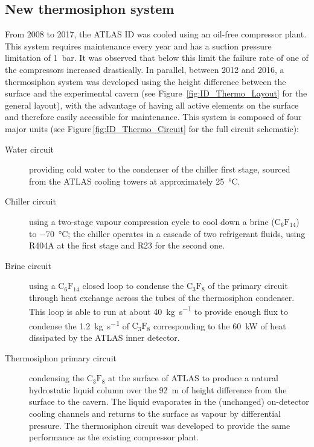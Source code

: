\documentclass[cernpreprint, atlasdraft=false, UKenglish,british,orcidlogo, texmf, orcidlogo]{atlasdoc}
\begin{document}
\subsection{New  thermosiphon system}
 
From 2008 to 2017, the ATLAS \gls{ID} was cooled using an oil-free compressor plant. This system requires maintenance every year and has a suction pressure limitation of \SI{1}{\bar}. It was observed that below this limit the failure rate of one of the compressors increased drastically. In parallel, between 2012 and 2016, a thermosiphon system was developed using the height difference between the surface and the experimental cavern (see Figure~\ref{fig:ID_Thermo_Layout} for the general layout), with the advantage of having all active elements on the surface and therefore easily accessible for maintenance. This system is composed of four major units (see Figure\,\ref{fig:ID_Thermo_Circuit} for the full circuit schematic):
 
\begin{description}
\item[Water circuit] providing cold water to the condenser of
the chiller first stage, sourced from the ATLAS
cooling towers at approximately \SI{25}{\degreeCelsius}.
\item[Chiller circuit] using a two-stage vapour compression cycle
to cool down a brine (${\text{C}}_6{\text{F}}_{14}$) to
\SI{-70}{\degreeCelsius}; the chiller operates in a cascade of two refrigerant fluids, using
R404A at the first stage and R23 for the second one.
\item[Brine circuit] using a ${\text{C}}_6{\text{F}}_{14}$ closed
loop to condense the ${\text{C}}_3{\text{F}}_{8}$ of the primary circuit through heat exchange across the tubes of the thermosiphon condenser. This
loop is able to run at about \SI{40}{\kg\per\second} to provide
enough flux to condense the \SI{1.2}{\kg\per\second} of
${\text{C}}_3{\text{F}}_{8}$ corresponding to the \SI{60}{\kilo\watt}
of heat dissipated by the ATLAS inner detector.
\item[Thermosiphon primary circuit] condensing the
${\text{C}}_3{\text{F}}_{8}$ at the surface of ATLAS to produce a
natural hydrostatic liquid column over the \SI{92}{\metre} of height
difference from the surface to the cavern. The liquid evaporates
in the (unchanged) on-detector cooling channels and returns to the
surface as vapour by differential pressure. The thermosiphon
circuit was developed to provide the same performance as the
existing compressor plant.
\end{description}
 
\end{document}
